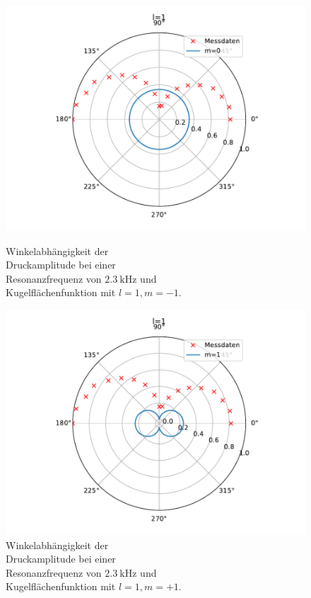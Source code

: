\FloatBarrier
\begin{figure}
    \hspace*{2cm}
    \begin{minipage}[b]{.4\linewidth} %
        \hspace*{-2cm}
        \includegraphics[width=\linewidth]{figure/9mmZwischenring_m0.pdf}
        \caption{Winkelabhängigkeit der\\ Druckamplitude bei einer \\ Resonanzfrequenz von $\SI{2.3}{\kilo\hertz}$ und \\ Kugelflächenfunktion mit $l=1,m=-1$.}
     \end{minipage}
     \hspace{.1\linewidth}%
     \begin{minipage}[b]{.4\linewidth} %
        \hspace*{-2cm}
        \includegraphics[width=\linewidth]{figure/9mmZwischenring_m1.pdf}
        \caption{Winkelabhängigkeit der\\ Druckamplitude bei einer \\ Resonanzfrequenz von $\SI{2.3}{\kilo\hertz}$ und \\ Kugelflächenfunktion mit $l=1,m=+1$.}
     \end{minipage}
\end{figure}
